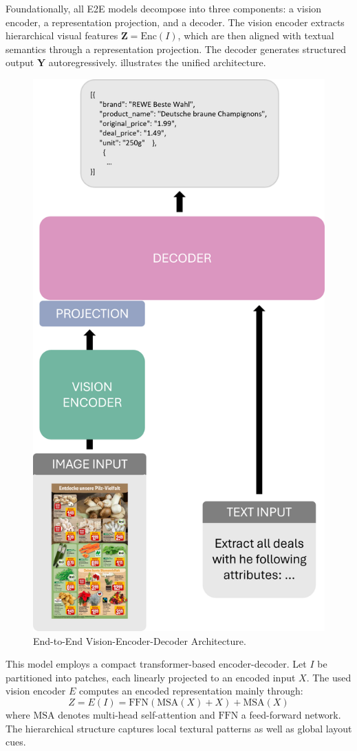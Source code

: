 \documentclass[11pt]{article}
\begin{document}
Foundationally, all E2E models decompose into three components: a vision encoder, a representation projection, and a decoder. The vision encoder extracts hierarchical visual features $ \mathbf{Z} = \text{Enc}(I) $, which are then aligned with textual semantics through a representation projection. The decoder generates structured output $ \mathbf{Y} $ autoregressively.  illustrates the unified architecture.

\begin{figure}[h!]
    \centering
    \includegraphics[width=0.5\linewidth]{figures/vlm_arch.png}
    \caption{End-to-End Vision-Encoder-Decoder Architecture.}
    \label{fig:e2e_arch}
\end{figure}

 This model employs a compact transformer-based encoder-decoder. Let $ I $ be partitioned into patches, each linearly projected to an encoded input $X$.  The used vision encoder $E$ computes an encoded representation mainly through:
\begin{equation}
Z = E(I) = \text{FFN}(\text{MSA}(X) + X) + \text{MSA}(X)
\end{equation}  
where $\text{MSA}$ denotes multi-head self-attention and $\text{FFN}$ a feed-forward network. The hierarchical structure captures local textural patterns as well as global layout cues.  
\end{document}
